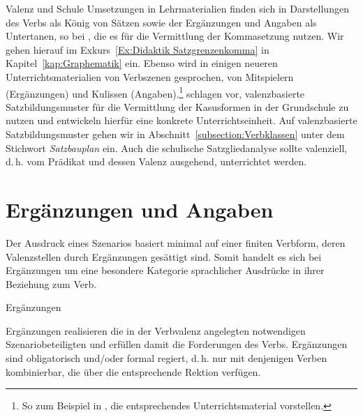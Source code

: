 \begin{Exkurs}{Valenz und Schule}
Umsetzungen in Lehrmaterialien finden sich in Darstellungen des Verbs als König von Sätzen sowie der Ergänzungen und Angaben als Untertanen, so \zB bei \citet[28--35] {LindauerSutter2005}, die es für die Vermittlung der Kommasetzung nutzen. Wir gehen hierauf im Exkurs~\ref{Ex:Didaktik Satzgrenzenkomma} in Kapitel~\ref{kap:Graphematik} ein. Ebenso wird in einigen neueren Unterrichtsmaterialien von Verbszenen gesprochen, von Mitspielern (Ergänzungen) und Kulissen (Angaben).\footnote{So zum Beispiel in \citet[36--43]{HoelzenWiechmann2020}, die entsprechendes Unterrichtsmaterial vorstellen.} \citet{Borggrefe_Krafft2023} schlagen vor, valenzbasierte Satzbildungsmuster für die Vermittlung der Kasusformen in der Grundschule zu nutzen und entwickeln hierfür eine konkrete Unterrichtseinheit. Auf valenzbasierte Satzbildungsmuster gehen wir in Abschnitt~\ref{subsection:Verbklassen} unter dem Stichwort \textit{Satzbauplan} ein. Auch die schulische Satzgliedanalyse sollte valenziell, d.\,h. vom Prädikat und dessen Valenz ausgehend, unterrichtet werden.

\end{Exkurs}


\section{Ergänzungen und Angaben}\label{subsection:EvsA}

Der Ausdruck eines Szenarios basiert minimal auf einer finiten Verbform, deren Valenzstellen durch Ergänzungen gesättigt sind. Somit handelt es sich bei Ergänzungen um eine besondere Kategorie sprachlicher Ausdrücke in ihrer Beziehung zum Verb.

\newpage
\begin{Definition}{Ergänzungen}
    
\noindent Ergänzungen realisieren die in der Verbvalenz angelegten notwendigen Szenariobeteiligten und erfüllen damit die Forderungen des Verbs. Ergänzungen sind obligatorisch und/oder formal regiert, d.\,h. nur mit denjenigen Verben kombinierbar, die über die entsprechende Rektion verfügen. 
\end{Definition}


